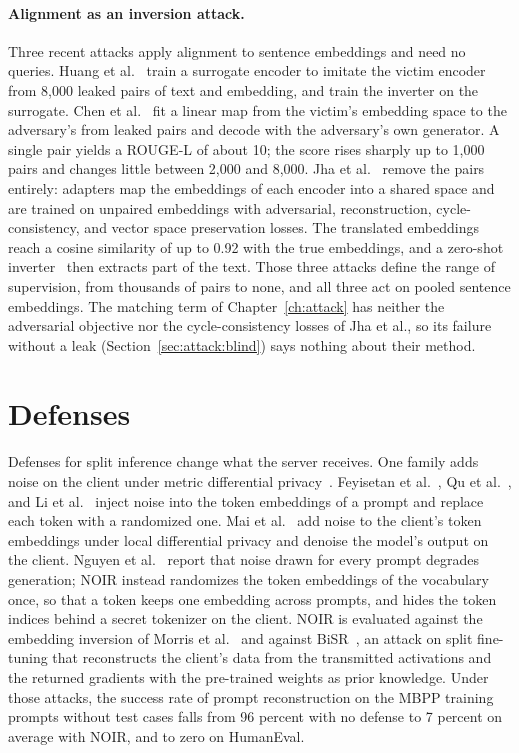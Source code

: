 \paragraph{Alignment as an inversion attack.} Three recent attacks apply alignment to sentence embeddings and need no queries.
Huang et al.~\cite{huang2024transferable} train a surrogate encoder to imitate the victim encoder from 8,000 leaked pairs of text and embedding, and train the inverter on the surrogate.
Chen et al.~\cite{chen2025algen} fit a linear map from the victim's embedding space to the adversary's from leaked pairs and decode with the adversary's own generator.
A single pair yields a ROUGE-L of about 10; the score rises sharply up to 1,000 pairs and changes little between 2,000 and 8,000.
Jha et al.~\cite{jha2025harnessing} remove the pairs entirely: adapters map the embeddings of each encoder into a shared space and are trained on unpaired embeddings with adversarial, reconstruction, cycle-consistency, and vector space preservation losses.
The translated embeddings reach a cosine similarity of up to 0.92 with the true embeddings, and a zero-shot inverter~\cite{zhang2025universal} then extracts part of the text.
Those three attacks define the range of supervision, from thousands of pairs to none, and all three act on pooled sentence embeddings.
The matching term of Chapter~\ref{ch:attack} has neither the adversarial objective nor the cycle-consistency losses of Jha et al., so its failure without a leak (Section~\ref{sec:attack:blind}) says nothing about their method.

\section{Defenses}\label{sec:lit:defense}

Defenses for split inference change what the server receives.
One family adds noise on the client under metric differential privacy~\cite{chatzikokolakis2013broadening}.
Feyisetan et al.~\cite{feyisetan2020privacy}, Qu et al.~\cite{qu2021natural}, and Li et al.~\cite{li2023privacy} inject noise into the token embeddings of a prompt and replace each token with a randomized one.
Mai et al.~\cite{mai2024split} add noise to the client's token embeddings under local differential privacy and denoise the model's output on the client.
Nguyen et al.~\cite{nguyen2026noir} report that noise drawn for every prompt degrades generation; NOIR instead randomizes the token embeddings of the vocabulary once, so that a token keeps one embedding across prompts, and hides the token indices behind a secret tokenizer on the client.
NOIR is evaluated against the embedding inversion of Morris et al.~\cite{morris2023text} and against BiSR~\cite{chen2024unveiling}, an attack on split fine-tuning that reconstructs the client's data from the transmitted activations and the returned gradients with the pre-trained weights as prior knowledge.
Under those attacks, the success rate of prompt reconstruction on the MBPP training prompts without test cases falls from 96 percent with no defense to 7 percent on average with NOIR, and to zero on HumanEval.


